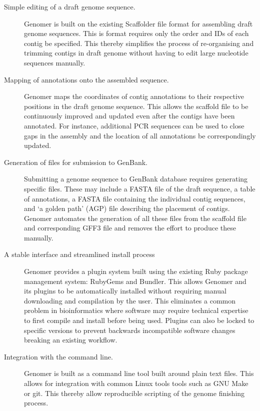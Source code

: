 \documentclass[10pt]{article}
\begin{document}
\begin{description} 

  \item[Simple editing of a draft genome sequence.]{Genomer is built on the
  existing Scaffolder \cite{barton2012} file format for assembling draft genome
  sequences. This is format requires only the order and IDs of each contig be
  specified. This thereby simplifies the process of re-organising and trimming
  contigs in draft genome without having to edit large nucleotide sequences
  manually.}

  \item[Mapping of annotations onto the assembled sequence.]{Genomer maps the
  coordinates of contig annotations to their respective positions in the draft
  genome sequence. This allows the scaffold file to be continuously improved
  and updated even after the contigs have been annotated. For instance,
  additional PCR sequences can be used to close gaps in the assembly and the
  location of all annotations be correspondingly updated.}

  \item[Generation of files for submission to GenBank.]{Submitting a genome
  sequence to GenBank database requires generating specific files. These may
  include a FASTA file of the draft sequence, a table of annotations, a FASTA
  file containing the individual contig sequences, and `a golden path' (AGP)
  \cite{agp-spec} file describing the placement of contigs. Genomer automates
  the generation of all these files from the scaffold file and corresponding
  GFF3 file and removes the effort to produce these manually.}

  \item[A stable interface and streamlined install process]{Genomer provides a
  plugin system built using the existing Ruby package management system:
  RubyGems and Bundler. This allows Genomer and its plugins to be automatically
  installed without requiring manual downloading and compilation by the user.
  This eliminates a common problem in bioinformatics where software may require
  technical expertise to first compile and install before being used. Plugins
  can also be locked to specific versions to prevent backwards incompatible
  software changes breaking an existing workflow.}

  \item[Integration with the command line.]{Genomer is built as a command line
  tool built around plain text files. This allows for integration with common
  Linux tools tools such as GNU Make or git. This thereby allow reproducible
  scripting of the genome finishing process.}

\end{description}
\end{document}
